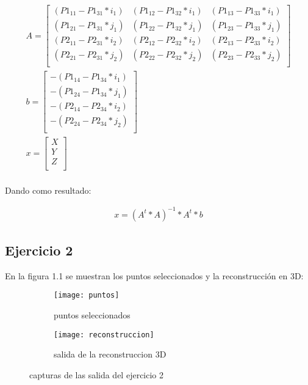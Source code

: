 \documentclass[paper=a4, fontsize=11pt]{scrartcl} %
\numberwithin{equation}{section} %
\numberwithin{figure}{section} %
\numberwithin{table}{section} %
\begin{document}
\begin{equation}
	\begin{array}{l}
		A = \begin{bmatrix}
				(P1_{11} - P1_{31}*i_1) & (P1_{12} - P1_{32}*i_1) & (P1_{13} - P1_{33}*i_1)\\
				(P1_{21} - P1_{31}*j_1) & (P1_{22} - P1_{32}*j_1) & (P1_{23} - P1_{33}*j_1)\\
				(P2_{11} - P2_{31}*i_2) & (P2_{12} - P2_{32}*i_2) & (P2_{13} - P2_{33}*i_2)\\
				(P2_{21} - P2_{31}*j_2) & (P2_{22} - P2_{32}*j_2) & (P2_{23} - P2_{33}*j_2)\\
			\end{bmatrix}\\
		b = \begin{bmatrix}
				-(P1_{14} - P1_{34}*i_1) \\
				-(P1_{24} - P1_{34}*j_1) \\
				-(P2_{14} - P2_{34}*i_2) \\
				-(P2_{24} - P2_{34}*j_2) \\
			\end{bmatrix}\\
		x = \begin{bmatrix}
				X\\
				Y\\
				Z\\
			\end{bmatrix}\\
	\end{array}
\end{equation} 

Dando como resultado:

\begin{equation}
	\begin{array}{l}
		x = (A^t*A)^{-1}*A^t*b
	\end{array}
\end{equation} 

\subsection{Ejercicio 2}
En la figura 1.1 se muestran los puntos seleccionados y la reconstrucción en 3D:\\

\begin{figure}
\begin{subfigure}{.5\textwidth}
  \centering
  \texttt{[image: puntos]}
  \caption{puntos seleccionados}
  \label{fig:sfig1}
\end{subfigure}%
\begin{subfigure}{.5\textwidth}
  \centering
  \texttt{[image: reconstruccion]}
  \caption{salida de la reconstruccion 3D}
  \label{fig:sfig2}
\end{subfigure}
\caption{capturas de las salida del ejercicio 2}
\label{fig:fig}
\end{figure}  
\end{document}

